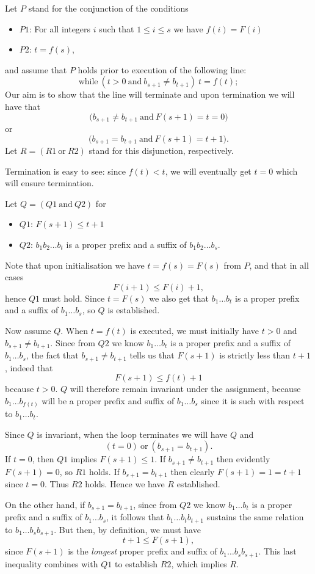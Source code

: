 \documentclass[11pt,oneside,a4paper]{article}
\begin{document}
Let $P$ stand for the conjunction of the conditions
\begin{itemize}
	\item $P1$: For all integers $i$ such that $1 \le i \le s$ we have  $f(i) = F(i)$
	\item $P2$: $t = f(s)$,
\end{itemize}
and assume that $P$ holds prior to execution of the following line:
\[
	\text{while}~(t > 0~\text{and}~b_{s+1} \ne b_{t+1})~t = f(t);
\]
Our aim is to show that the line will terminate and upon termination we will have that
\[ \big( b_{s+1} \ne b_{t+1}~\text{and}~F(s+1) = t = 0 \big) \]
or
\[ \big( b_{s+1} = b_{t+1}~\text{and}~F(s+1) = t+1 \big). \]
Let $R = (R1~\text{or}~R2)$ stand for this disjunction, respectively.

Termination is easy to see: since $f(t) < t$, we will eventually get $t = 0$ which will ensure
termination.

Let $Q = (Q1~\text{and}~Q2)$ for
\begin{itemize}
	\item $Q1$: $F(s+1) \le t + 1$
	\item $Q2$: $b_1b_2\ldots{}b_t$ is a proper prefix and a suffix of $b_1b_2\ldots{}b_s$.
\end{itemize}
Note that upon initialisation we have $t = f(s) = F(s)$ from $P$, and that in all cases
\[ F(i+1) \le F(i) + 1, \]
hence $Q1$ must hold. Since $t = F(s)$ we also get that $b_1\ldots{}b_t$ is a proper prefix and a
suffix of $b_1\ldots{}b_s$, so $Q$ is established.

Now assume $Q$. 
When $t = f(t)$ is executed, we must initially have $t > 0$ and $b_{s+1}\ne{}b_{t+1}$. 
Since from $Q2$ we know $b_1\ldots{}b_t$ is a proper prefix and a suffix of $b_1\ldots{}b_s$, the
fact that $b_{s+1}\ne{}b_{t+1}$ tells us that $F(s + 1)$ is strictly less than $t+1$, indeed that
\[ F(s + 1) \le f(t) + 1 \]
because $t > 0$. $Q$ will therefore remain invariant under the assignment, because
$b_1\ldots{}b_{f(t)}$ will be a proper prefix and suffix of $b_1\ldots{}b_s$ since it is such with
respect to $b_1\ldots{}b_t$.

Since $Q$ is invariant, when the loop terminates we will have $Q$ and
\[ (t = 0)~\text{or}~(b_{s+1} = b_{t+1}). \]
If $t = 0$, then $Q1$ implies $F(s+1) \le 1$.
If $b_{s+1} \ne b_{t+1}$ then evidently $F(s+1) = 0$, so $R1$ holds.
If $b_{s+1} = b_{t+1}$ then clearly $F(s+1) = 1 = t + 1$ since $t = 0$. Thus $R2$ holds.
Hence we have $R$ established.

On the other hand, if $b_{s+1} = b_{t+1}$, since from $Q2$ we know $b_1\ldots{}b_t$ is a proper
prefix and a suffix of $b_1\ldots{}b_s$, it follows that $b_1\ldots{}b_{t}b_{t+1}$ sustains the same
relation to $b_1\ldots{}b_{s}b_{s+1}$. But then, by definition, we must have \[t + 1 \le F(s+1),\]
since $F(s+1)$ is the \textit{longest} proper prefix and suffix of $b_1\ldots{}b_{s}b_{s+1}$.
This last inequality combines with $Q1$ to establish $R2$, which implies $R$.
\end{document}
